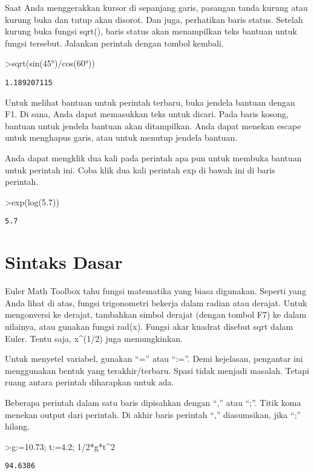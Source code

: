 \documentclass[
]{book}
\begin{document}
Saat Anda menggerakkan kursor di sepanjang garis, pasangan tanda kurung atau kurung buka dan tutup akan disorot. Dan juga, perhatikan baris status. Setelah kurung buka fungsi sqrt(), baris status akan menampilkan teks bantuan untuk fungsi tersebut. Jalankan perintah dengan tombol kembali.

\textgreater sqrt(sin(45°)/cos(60°))

\begin{verbatim}
1.189207115
\end{verbatim}

Untuk melihat bantuan untuk perintah terbaru, buka jendela bantuan dengan F1. Di sana, Anda dapat memasukkan teks untuk dicari. Pada baris kosong, bantuan untuk jendela bantuan akan ditampilkan. Anda dapat menekan escape untuk menghapus garis, atau untuk menutup jendela bantuan.

Anda dapat mengklik dua kali pada perintah apa pun untuk membuka bantuan untuk perintah ini. Coba klik dua kali perintah exp di bawah ini di baris perintah.

\textgreater exp(log(5.7))

\begin{verbatim}
5.7
\end{verbatim}

\section{Sintaks Dasar}\label{sintaks-dasar}

Euler Math Toolbox tahu fungsi matematika yang biasa digunakan. Seperti yang Anda lihat di atas, fungsi trigonometri bekerja dalam radian atau derajat. Untuk mengonversi ke derajat, tambahkan simbol derajat (dengan tombol F7) ke dalam nilainya, atau gunakan fungsi rad(x). Fungsi akar kuadrat disebut sqrt dalam Euler. Tentu saja, x\^{}(1/2) juga memungkinkan.

Untuk menyetel variabel, gunakan ``='' atau ``:=''. Demi kejelasan, pengantar ini menggunakan bentuk yang terakhir/terbaru. Spasi tidak menjadi masalah. Tetapi ruang antara perintah diharapkan untuk ada.

Beberapa perintah dalam satu baris dipisahkan dengan ``,'' atau ``;''. Titik koma menekan output dari perintah. Di akhir baris perintah ``,'' diasumsikan, jika ``;'' hilang.

\textgreater g:=10.73; t:=4.2; 1/2*g*t\^{}2

\begin{verbatim}
94.6386
\end{verbatim}
\end{document}
